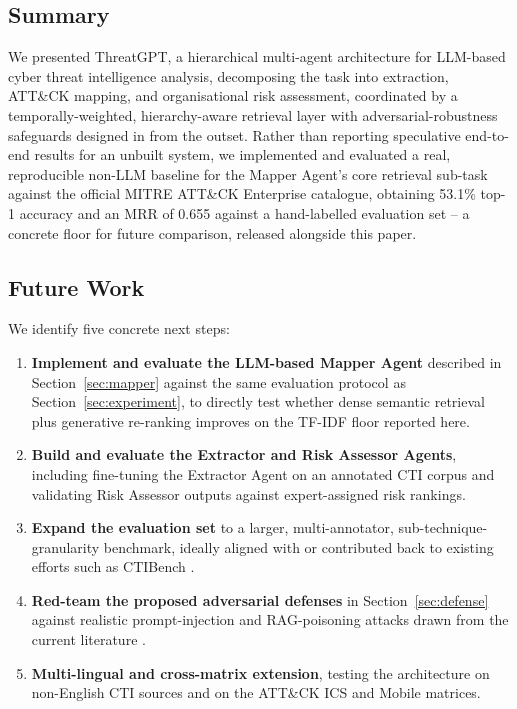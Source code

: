 \documentclass[runningheads]{llncs}
\begin{document}
\subsection{Summary}

We presented ThreatGPT, a hierarchical multi-agent architecture for LLM-based cyber threat intelligence analysis, decomposing the task into extraction, ATT\&CK mapping, and organisational risk assessment, coordinated by a temporally-weighted, hierarchy-aware retrieval layer with adversarial-robustness safeguards designed in from the outset. Rather than reporting speculative end-to-end results for an unbuilt system, we implemented and evaluated a real, reproducible non-LLM baseline for the Mapper Agent's core retrieval sub-task against the official MITRE ATT\&CK Enterprise catalogue, obtaining 53.1\% top-1 accuracy and an MRR of 0.655 against a hand-labelled evaluation set -- a concrete floor for future comparison, released alongside this paper.

\subsection{Future Work}

We identify five concrete next steps:
\begin{enumerate}
    \item \textbf{Implement and evaluate the LLM-based Mapper Agent} described in Section~\ref{sec:mapper} against the same evaluation protocol as Section~\ref{sec:experiment}, to directly test whether dense semantic retrieval plus generative re-ranking improves on the TF-IDF floor reported here.
    \item \textbf{Build and evaluate the Extractor and Risk Assessor Agents}, including fine-tuning the Extractor Agent on an annotated CTI corpus and validating Risk Assessor outputs against expert-assigned risk rankings.
    \item \textbf{Expand the evaluation set} to a larger, multi-annotator, sub-technique-granularity benchmark, ideally aligned with or contributed back to existing efforts such as CTIBench \cite{ctibench2024}.
    \item \textbf{Red-team the proposed adversarial defenses} in Section~\ref{sec:defense} against realistic prompt-injection and RAG-poisoning attacks drawn from the current literature \cite{poisonedrag2025}.
    \item \textbf{Multi-lingual and cross-matrix extension}, testing the architecture on non-English CTI sources and on the ATT\&CK ICS and Mobile matrices.
    \end{enumerate}
\end{document}
